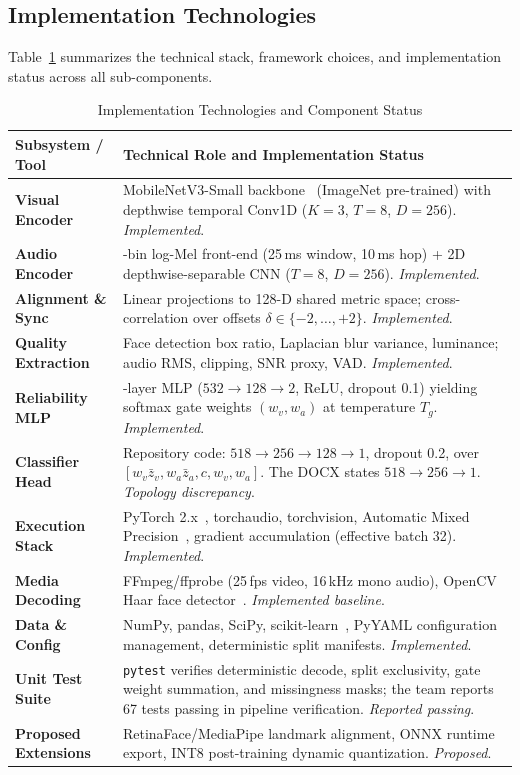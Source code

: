 \documentclass[conference]{IEEEtran}
\begin{document}
\subsection{Implementation Technologies}
Table~\ref{tab:technologies} summarizes the technical stack, framework choices, and implementation status across all sub-components.

\begin{table}[t]
\caption{Implementation Technologies and Component Status}
\label{tab:technologies}
\centering
\scriptsize
\setlength{\tabcolsep}{3pt}
\renewcommand{\arraystretch}{1.15}
\begin{tabular}{>{\raggedright\arraybackslash}p{2.3cm}>{\raggedright\arraybackslash}p{5.8cm}}
\toprule
\textbf{Subsystem / Tool} & \textbf{Technical Role and Implementation Status} \\
\midrule
\textbf{Visual Encoder} & MobileNetV3-Small backbone~\cite{howard2019} (ImageNet pre-trained) with depthwise temporal Conv1D ($K=3$, $T=8$, $D=256$). \emph{Implemented}. \\
\textbf{Audio Encoder} & 80-bin log-Mel front-end (25\,ms window, 10\,ms hop) + 2D depthwise-separable CNN ($T=8$, $D=256$). \emph{Implemented}. \\
\textbf{Alignment \& Sync} & Linear projections to 128-D shared metric space; cross-correlation over offsets $\delta \in \{-2,\dots,+2\}$. \emph{Implemented}. \\
\textbf{Quality Extraction} & Face detection box ratio, Laplacian blur variance, luminance; audio RMS, clipping, SNR proxy, VAD. \emph{Implemented}. \\
\textbf{Reliability MLP} & 2-layer MLP ($532 \to 128 \to 2$, ReLU, dropout 0.1) yielding softmax gate weights $(w_v, w_a)$ at temperature $T_g$. \emph{Implemented}. \\
\textbf{Classifier Head} & Repository code: $518 \to 256 \to 128 \to 1$, dropout 0.2, over $[w_v \bar{z}_v,w_a \bar{z}_a,c,w_v,w_a]$. The DOCX states $518\to256\to1$. \emph{Topology discrepancy}. \\
\textbf{Execution Stack} & PyTorch 2.x~\cite{paszke2019}, torchaudio, torchvision, Automatic Mixed Precision~\cite{micikevicius2018}, gradient accumulation (effective batch 32). \emph{Implemented}. \\
\textbf{Media Decoding} & FFmpeg/ffprobe (25\,fps video, 16\,kHz mono audio), OpenCV Haar face detector~\cite{viola2001}. \emph{Implemented baseline}. \\
\textbf{Data \& Config} & NumPy, pandas, SciPy, scikit-learn~\cite{pedregosa2011}, PyYAML configuration management, deterministic split manifests. \emph{Implemented}. \\
\textbf{Unit Test Suite} & \texttt{pytest} verifies deterministic decode, split exclusivity, gate weight summation, and missingness masks; the team reports 67 tests passing in pipeline verification. \emph{Reported passing}. \\
\midrule
\textbf{Proposed Extensions} & RetinaFace/MediaPipe landmark alignment, ONNX runtime export, INT8 post-training dynamic quantization. \emph{Proposed}. \\
\bottomrule
\end{tabular}
\end{table}
\end{document}
